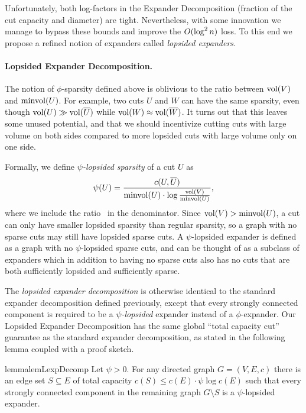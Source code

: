 \documentclass[letterpaper,11pt]{article}
\begin{document}
Unfortunately, both log-factors in the Expander Decomposition (fraction of the cut capacity and diameter) are tight. Nevertheless, with some innovation we manage to bypass these bounds and improve the $O(\log^2 n)$ loss. To this end we propose a refined notion of expanders called \emph{lopsided expanders.}

\paragraph{Lopsided Expander Decomposition.}

The notion of $\phi$-sparsity defined above is oblivious to the ratio between $\operatorname{vol}(V)$ and $\operatorname{minvol}(U)$. For example, two cuts $U$ and $W$ can have the same sparsity, even though $\operatorname{vol}(U) \gg \operatorname{vol}(\overline U)$ while $\operatorname{vol}(W) \approx \operatorname{vol}(\overline W)$. It turns out that this leaves some unused potential, and that we should incentivize cutting cuts with large volume on both sides compared to more lopsided cuts with large volume only on one side.

Formally, we define \emph{$\psi$-lopsided sparsity} of a cut $U$ as 
\begin{align*}
	\psi(U) = \frac{c(U, \overline U)}{\operatorname{minvol}(U) \cdot \log \frac{\operatorname{vol}(V)}{\operatorname{minvol}(U)}},
\end{align*}
where we include the ratio~ in the denominator. Since $\operatorname{vol}(V)>\operatorname{minvol}(U)$, a cut can only have smaller lopsided sparsity than regular sparsity, so a graph with no sparse cuts may still have lopsided sparse cuts. A $\psi$-lopsided expander is defined as a graph with no $\psi$-lopsided sparse cuts, and can be thought of as a subclass of expanders which in addition to having no sparse cuts also has no cuts that are both sufficiently lopsided and sufficiently sparse.

The \emph{lopsided expander decomposition} is otherwise identical to the standard expander decomposition defined previously, except that every strongly connected component is required to be a \emph{$\psi$-lopsided} expander instead of a $\phi$-expander. Our Lopsided Expander Decomposition has the same global ``total capacity cut'' guarantee as the standard expander decomposition, as stated in the following lemma coupled with a proof sketch.

\begin{restatable}{lemma}{lemLexpDecomp} \label{lem:lexp-decomp}
	Let $\psi > 0$. For any directed graph $G = (V, E, c)$ there is an edge set $S \subseteq E$ of total capacity $c(S) \leq c(E) \cdot \psi \log c(E)$ such that every strongly connected component in the remaining graph $G \setminus S$ is a $\psi$-lopsided expander.
\end{restatable}
\end{document}
